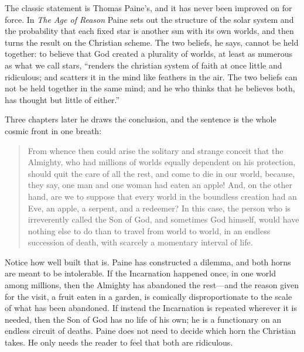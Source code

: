 The classic statement is Thomas Paine's, and it has never been improved on for force. In \emph{The Age of Reason} Paine sets out the structure of the solar system and the probability that each fixed star is another sun with its own worlds, and then turns the result on the Christian scheme. The two beliefs, he says, cannot be held together: to believe that God created a plurality of worlds, at least as numerous as what we call stars, ``renders the christian system of faith at once little and ridiculous; and scatters it in the mind like feathers in the air. The two beliefs can not be held together in the same mind; and he who thinks that he believes both, has thought but little of either.''

Three chapters later he draws the conclusion, and the sentence is the whole cosmic front in one breath:

\begin{quote}\small
From whence then could arise the solitary and strange conceit that the Almighty, who had millions of worlds equally dependent on his protection, should quit the care of all the rest, and come to die in our world, because, they say, one man and one woman had eaten an apple! And, on the other hand, are we to suppose that every world in the boundless creation had an Eve, an apple, a serpent, and a redeemer? In this case, the person who is irreverently called the Son of God, and sometimes God himself, would have nothing else to do than to travel from world to world, in an endless succession of death, with scarcely a momentary interval of life.
\end{quote}

Notice how well built that is. Paine has constructed a dilemma, and both horns are meant to be intolerable. If the Incarnation happened once, in one world among millions, then the Almighty has abandoned the rest---and the reason given for the visit, a fruit eaten in a garden, is comically disproportionate to the scale of what has been abandoned. If instead the Incarnation is repeated wherever it is needed, then the Son of God has no life of his own; he is a functionary on an endless circuit of deaths. Paine does not need to decide which horn the Christian takes. He only needs the reader to feel that both are ridiculous.

